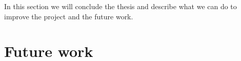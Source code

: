 In this section we will conclude the thesis and describe what we can do to improve the project and the future work.

\section{Future work}
